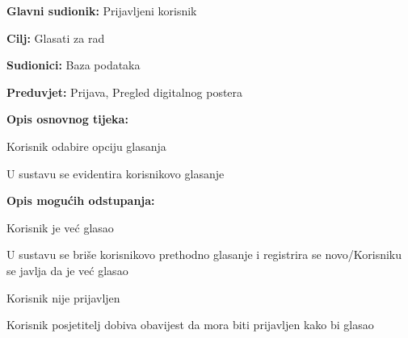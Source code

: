 					\noindent {}
					\begin{packed_item}
						
						\item \textbf{Glavni sudionik: } Prijavljeni korisnik
						\item  \textbf{Cilj:} Glasati za rad
						\item  \textbf{Sudionici:} Baza podataka
						\item  \textbf{Preduvjet:} Prijava, Pregled digitalnog postera
						\item  \textbf{Opis osnovnog tijeka:}
						
						\item[] \begin{packed_enum}
							
							\item Korisnik odabire opciju glasanja
							\item U sustavu se evidentira korisnikovo glasanje
						\end{packed_enum}
						
						\item  \textbf{Opis mogućih odstupanja:}
						
						\item[] \begin{packed_item}
							
							\item[2.a] Korisnik je već glasao
							\item[] \begin{packed_enum}
								\item U sustavu se briše korisnikovo prethodno glasanje i registrira se novo/Korisniku se javlja da je već glasao
							\end{packed_enum}
							\item[2.b] Korisnik nije prijavljen
								\item[] \begin{packed_enum}
									\item Korisnik posjetitelj dobiva obavijest da mora biti prijavljen kako bi glasao
							\end{packed_enum}
						\end{packed_item}
					\end{packed_item}
					
